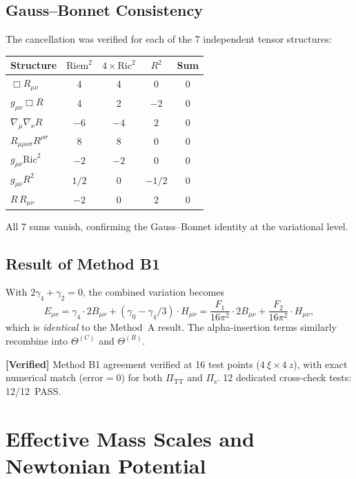 \documentclass[11pt,a4paper]{article}
\theoremstyle{plain}
\theoremstyle{definition}
\newcommand{\verified}[1]{%
  \par\smallskip\noindent
  \colorbox{green!10}{\parbox{\dimexpr\linewidth-2\fboxsep}{%
    \textcolor{green!50!black}{\textbf{[Verified]}} #1}}%
  \par\smallskip}
\begin{document}
\subsection{Gauss--Bonnet Consistency}

The cancellation was verified for each of the 7 independent tensor
structures:

\begin{center}
\begin{tabular}{lcccc}
\toprule
Structure & $\mathrm{Riem}^2$ & $4\times\mathrm{Ric}^2$ & $R^2$ & Sum \\
\midrule
$\Box R_{\mu\nu}$ & 4 & 4 & 0 & 0 \\
$g_{\mu\nu}\Box R$ & 4 & 2 & $-2$ & 0 \\
$\nabla_\mu\nabla_\nu R$ & $-6$ & $-4$ & $2$ & 0 \\
$R_{\mu\rho\nu\sigma}R^{\rho\sigma}$ & 8 & 8 & 0 & 0 \\
$g_{\mu\nu}\mathrm{Ric}^2$ & $-2$ & $-2$ & 0 & 0 \\
$g_{\mu\nu}R^2$ & $1/2$ & 0 & $-1/2$ & 0 \\
$R\,R_{\mu\nu}$ & $-2$ & 0 & $2$ & 0 \\
\bottomrule
\end{tabular}
\end{center}

\noindent All 7 sums vanish, confirming the Gauss--Bonnet identity at
the variational level.

\subsection{Result of Method B1}

With $2\gamma_4 + \gamma_2 = 0$, the combined variation becomes
\begin{equation}
  E_{\mu\nu} = \gamma_4\cdot 2B_{\mu\nu}
  + (\gamma_0 - \gamma_4/3)\cdot H_{\mu\nu}
  = \frac{F_1}{16\pi^2}\cdot 2B_{\mu\nu}
  + \frac{F_2}{16\pi^2}\cdot H_{\mu\nu},
\end{equation}
which is \emph{identical} to the Method~A result. The alpha-insertion
terms similarly recombine into $\Theta^{(C)}$ and $\Theta^{(R)}$.

\verified{Method B1 agreement verified at 16 test points
($4~\xi \times 4~z$), with exact numerical match ($\mathrm{error} = 0$)
for both $\Pi_{\mathrm{TT}}$ and $\Pi_{\mathrm{s}}$.
12 dedicated cross-check tests: 12/12~PASS.}

\section{Effective Mass Scales and Newtonian Potential}
\label{sec:masses}
\end{document}

